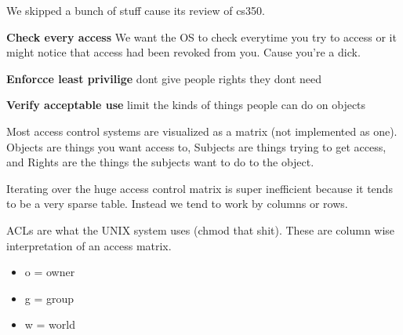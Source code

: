 \documentclass{article}
\begin{document}
We skipped a bunch of stuff cause its review of cs350. 



\textbf{Check every access} We want the OS to check everytime you try to access or it might notice that access had been revoked from you. Cause you're a dick.

\textbf{Enforcce least privilige} dont give people rights they dont need

\textbf{Verify acceptable use} limit the kinds of things people can do on objects


Most access control systems are visualized as a matrix (not implemented as one). Objects are things you want access to, Subjects are things trying to get access, and Rights are the things the subjects want to do to the object. 


Iterating over the huge access control matrix is super inefficient because it tends to be a very sparse table. Instead we tend to work by columns or rows.


ACLs are what the UNIX system uses (chmod that shit). These are column wise interpretation of an access matrix.

\begin{itemize}
	\item o = owner
	\item g = group
	\item w = world
\end{itemize}
\end{document}
